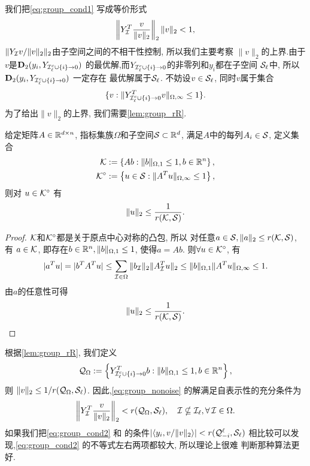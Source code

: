 我们把\eqref{eq:group_cond1} 写成等价形式
\begin{equation*}
  \left\|Y_{\mathcal{I}}^T \frac{v}{\|v\|_2}\right\|_2 \|v\|_2<1,
\end{equation*}
\(\|Y_{\mathcal{I}} v/\|v\|_2\|_2\)由子空间之间的不相干性控制, 所以我们主要考察
$\|v\|_2$的上界.由于$v$是$\mathbf{D}_2(y_i, Y_{\mathcal{I}_\ell^c\cup \{i\}\rightarrow 0})$
的最优解,而$Y_{\mathcal{I}_\ell^c\cup \{i\}\rightarrow 0}$的非零列和$y_i$都在子空间
$\mathcal{S}_\ell$中, 所以$\mathbf{D}_2(y_i, Y_{\mathcal{I}_\ell^c\cup \{i\}\rightarrow 0})$ 一定存在
最优解属于$\mathcal{S}_\ell$. 不妨设$v\in \mathcal{S}_\ell$, 同时$v$属于集合
$$\{ v: \|Y^T_{\mathcal{I}_\ell^c\cup \{i\}\rightarrow 0} v\|_{\Omega,\infty}\le
1\}.$$
为了给出$\|v\|_2$的上界, 我们需要\autoref{lem:group_rR}. 
\begin{lemma}\label{lem:group_rR}
  给定矩阵$A\in \mathbb{R}^{d\times n}$, 指标集族$\Omega$和子空间$\mathcal{S}\subset \mathbb{R}^d$,
  满足$A$中的每列$A_i\in \mathcal{S}$, 定义集合
  \begin{align*}
    \mathcal{K} &:= \left\{ Ab: \|b\|_{\Omega, 1}\le 1, b\in \mathbb{R}^n \right\},\\
    \mathcal{K}^\circ &:= \left\{ u\in \mathcal{S} : \|A^Tu\|_{\Omega, \infty}\le 1 \right\},
  \end{align*}
  则对 $u\in \mathcal{K}^\circ$ 有
  $$ \|u\|_2 \le \frac{1}{r(\mathcal{K}, \mathcal{S})}.$$
\end{lemma}
\begin{proof}
  $\mathcal{K}$和$\mathcal{K}^\circ$都是关于原点中心对称的凸包, 所以
  对任意$a\in \mathcal{S}, \|a\|_2\le r(\mathcal{K}, \mathcal{S})$, 有 $a \in \mathcal{K}$,
  即存在$ b\in\mathbb{R}^n, \|b\|_{\Omega, 1}\le 1$, 使得$a=Ab$. 则$\forall u\in
  \mathcal{K}^\circ$,
  有
  \begin{equation*}
    |a^T u| = |b^T A^T u| \le \sum_{\mathcal{I}\in \Omega} \|b_{\mathcal{I}}\|_2 \|A^T_{\mathcal{I}} u\|_2
    \le \|b\|_{\Omega, 1}\|A^T u\|_{\Omega,\infty} \le 1.
  \end{equation*}
  由$a$的任意性可得
  $$ \|u\|_2 \le \frac{1}{r(\mathcal{K}, \mathcal{S})}.$$
\end{proof}
根据\autoref{lem:group_rR}, 我们定义
\begin{equation*}
  \mathcal{Q}_\Omega := \left\{ Y^T_{\mathcal{I}_\ell^c\cup \{i\}\rightarrow 0}b:
  \|b\|_{\Omega, 1}\le 1, b\in \mathbb{R}^n \right\},
\end{equation*}
则 $\|v\|_2 \le 1/r(\mathcal{Q}_\Omega, \mathcal{S}_\ell)$.
因此,\eqref{eq:group_nonoise} 的解满足自表示性的充分条件为
\begin{equation} \label{eq:group_cond2}
  \left\|Y_{\mathcal{I}}^T \frac{v}{\|v\|_2}\right\|_2 < r(\mathcal{Q}_\Omega, \mathcal{S}_\ell), \quad
  \mathcal{I} \nsubseteq \mathcal{I}_\ell, \forall\, \mathcal{I} \in \Omega.
\end{equation}
如果我们把\eqref{eq:group_cond2} 和\cite[定理~2.5]{soltanolkotabi2012geometric}
的条件$|\langle y_i, v/\|v\|_2\rangle|<r(\mathcal{Q}^\ell_{-i}, \mathcal{S}_\ell)$
相比较可以发现,\eqref{eq:group_cond2} 的不等式左右两项都较大, 所以理论上很难
判断那种算法更好.
